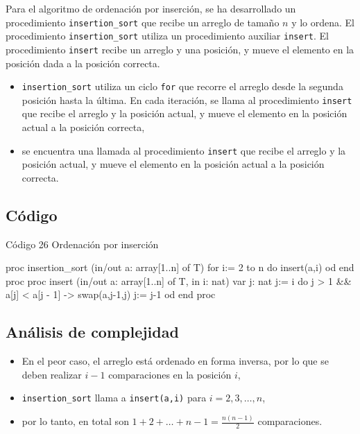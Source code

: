 Para el algoritmo de ordenación por inserción, se ha desarrollado un procedimiento \texttt{insertion\_sort} que recibe un arreglo de tamaño $n$ y lo ordena. El procedimiento \texttt{insertion\_sort} utiliza un procedimiento auxiliar \texttt{insert}. El procedimiento \texttt{insert} recibe un arreglo y una posición, y mueve el elemento en la posición dada a la posición correcta. 

\begin{itemize}
    \item \texttt{insertion\_sort} utiliza un ciclo \texttt{for} que recorre el arreglo desde la segunda posición hasta la última. En cada iteración, se llama al procedimiento \texttt{insert} que recibe el arreglo y la posición actual, y mueve el elemento en la posición actual a la posición correcta,
    \item se encuentra una llamada al procedimiento \texttt{insert} que recibe el arreglo y la posición actual, y mueve el elemento en la posición actual a la posición correcta.
\end{itemize}

\subsection{Código}

\begin{codebox}{Código 26}
\footnotesize Ordenación por inserción
\tcblower
\begin{pascallike}
proc insertion_sort (in/out a: array[1..n] of T)
    for i:= 2 to n do
        insert(a,i)
    od
end proc
proc insert (in/out a: array[1..n] of T, in i: nat)
    var j: nat
    j:= i
    do j > 1 && a[j] < a[j - 1] -> 
        swap(a,j-1,j)
        j:= j-1
    od
end proc
\end{pascallike}
\end{codebox}

\subsection{Análisis de complejidad}
\begin{itemize}
    \item En el peor caso, el arreglo está ordenado en forma inversa, por lo que se deben realizar $i-1$ comparaciones en la posición $i$,
    \item \texttt{insertion\_sort} llama a \texttt{insert(a,i)} para $i=2,3,\ldots,n$,
    \item por lo tanto, en total son $1 + 2 + \ldots + n-1 = \frac{n(n-1)}{2}$ comparaciones.
\end{itemize}